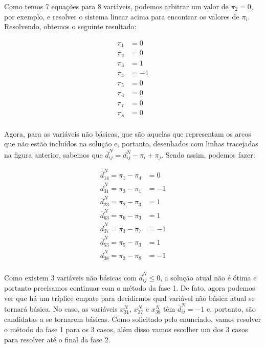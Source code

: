 \documentclass{article}
\begin{document}
Como temos 7 equações para 8 variáveis, podemos arbitrar um valor de $\pi_{2} = 0$, por exemplo, e resolver o sistema linear acima para encontrar os valores de $\pi_{i}$.
Resolvendo, obtemos o seguinte resultado:

\begin{align*}
    \pi_{1} &= 0 \\
    \pi_{2} &= 0 \\
    \pi_{3} &= 1 \\
    \pi_{4} &= -1 \\
    \pi_{5} &= 0 \\
    \pi_{6} &= 0 \\
    \pi_{7} &= 0 \\
    \pi_{8} &= 0 \\
\end{align*}

Agora, para as variáveis não básicas, que são aquelas que representam os arcos que não estão incluídos na solução e, portanto, desenhados com linhas tracejadas na figura anterior, sabemos que $\overline{d}^{N}_{ij} = d^{N}_{ij} - \pi_{i} + \pi_{j}$.
Sendo assim, podemos fazer:

\begin{align*}
    \overline{d}^{N}_{14} = \pi_{1} - \pi_{4} &=  0 \\
    \overline{d}^{N}_{31} = \pi_{3} - \pi_{1} &= -1 \\
    \overline{d}^{N}_{23} = \pi_{2} - \pi_{3} &=  1 \\
    \overline{d}^{N}_{63} = \pi_{6} - \pi_{3} &=  1 \\
    \overline{d}^{N}_{37} = \pi_{3} - \pi_{7} &= -1 \\
    \overline{d}^{N}_{53} = \pi_{5} - \pi_{3} &=  1 \\
    \overline{d}^{N}_{38} = \pi_{3} - \pi_{8} &= -1 \\
\end{align*}

Como existem 3 variáveis não básicas com $\overline{d}^{N}_{ij} \leq 0$, a solução atual não é ótima e portanto precisamos continuar com o método da fase 1.
De fato, agora podemos ver que há um tríplice empate para decidirmos qual variável não básica atual se tornará básica.
No caso, as variáveis $x^{N}_{31}$, $x^{N}_{37}$ e $x^{N}_{38}$ têm $\overline{d}^{N}_{ij} = -1$ e, portanto, são candidatas a se tornarem básicas.
Como solicitado pelo enunciado, vamos resolver o método da fase 1 para os 3 casos, além disso vamos escolher um dos 3 casos para resolver até o final da fase 2.
\end{document}
